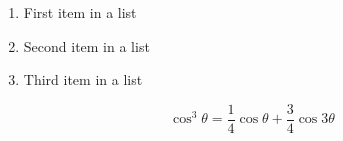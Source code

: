 \begin{enumerate}[noitemsep] %
\item First item in a list
\item Second item in a list
\item Third item in a list
\end{enumerate}

\begin{equation}
\cos^3 \theta =\frac{1}{4}\cos\theta+\frac{3}{4}\cos 3\theta
\label{eq:refname2}
\end{equation}

